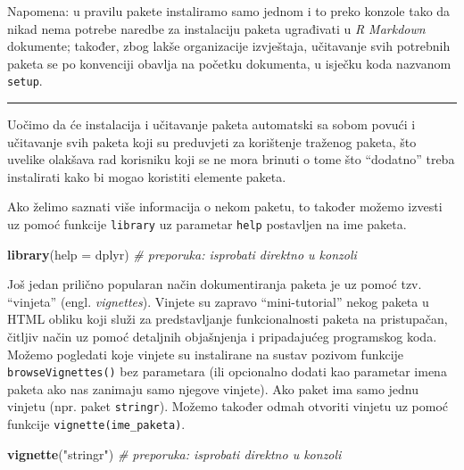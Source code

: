 \documentclass[]{book}
\newenvironment{Shaded}{\begin{snugshade}}{\end{snugshade}}
\newcommand{\KeywordTok}[1]{\textcolor[rgb]{0.13,0.29,0.53}{\textbf{#1}}}
\newcommand{\DataTypeTok}[1]{\textcolor[rgb]{0.13,0.29,0.53}{#1}}
\newcommand{\StringTok}[1]{\textcolor[rgb]{0.31,0.60,0.02}{#1}}
\newcommand{\CommentTok}[1]{\textcolor[rgb]{0.56,0.35,0.01}{\textit{#1}}}
\newcommand{\NormalTok}[1]{#1}
\theoremstyle{definition}
\theoremstyle{definition}
\theoremstyle{definition}
\theoremstyle{remark}
\begin{document}
Napomena: u pravilu pakete instaliramo samo jednom i to preko konzole
tako da nikad nema potrebe naredbe za instalaciju paketa ugrađivati u
\emph{R Markdown} dokumente; također, zbog lakše organizacije
izvještaja, učitavanje svih potrebnih paketa se po konvenciji obavlja na
početku dokumenta, u isječku koda nazvanom \texttt{setup}.

\begin{center}\rule{0.5\linewidth}{\linethickness}\end{center}

Uočimo da će instalacija i učitavanje paketa automatski sa sobom povući
i učitavanje svih paketa koji su preduvjeti za korištenje traženog
paketa, što uvelike olakšava rad korisniku koji se ne mora brinuti o
tome što ``dodatno'' treba instalirati kako bi mogao koristiti elemente
paketa.

Ako želimo saznati više informacija o nekom paketu, to također možemo
izvesti uz pomoć funkcije \texttt{library} uz parametar \texttt{help}
postavljen na ime paketa.

\begin{Shaded}
\begin{Highlighting}[]
\KeywordTok{library}\NormalTok{(}\DataTypeTok{help =}\NormalTok{ dplyr)  }\CommentTok{# preporuka: isprobati direktno u konzoli}
\end{Highlighting}
\end{Shaded}

Još jedan prilično popularan način dokumentiranja paketa je uz pomoć
tzv. ``vinjeta'' (engl. \emph{vignettes}). Vinjete su zapravo
``mini-tutorial'' nekog paketa u HTML obliku koji služi za
predstavljanje funkcionalnosti paketa na pristupačan, čitljiv način uz
pomoć detaljnih objašnjenja i pripadajućeg programskog koda. Možemo
pogledati koje vinjete su instalirane na sustav pozivom funkcije
\texttt{browseVignettes()} bez parametara (ili opcionalno dodati kao
parametar imena paketa ako nas zanimaju samo njegove vinjete). Ako paket
ima samo jednu vinjetu (npr. paket \texttt{stringr}). Možemo također
odmah otvoriti vinjetu uz pomoć funkcije \texttt{vignette(ime\_paketa)}.

\begin{Shaded}
\begin{Highlighting}[]
\KeywordTok{vignette}\NormalTok{(}\StringTok{"stringr"}\NormalTok{)  }\CommentTok{# preporuka: isprobati direktno u konzoli}
\end{Highlighting}
\end{Shaded}
\end{document}

